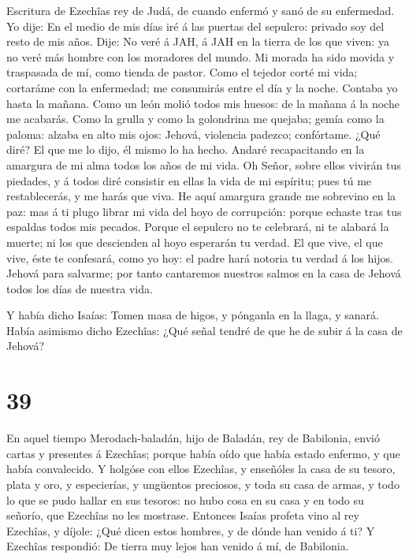  Escritura de Ezechîas rey de Judá, de cuando enfermó y sanó
de su enfermedad.  Yo dije: En el medio de mis días iré á
las puertas del sepulcro: privado soy del resto de mis años.
 Dije: No veré á JAH, á JAH en la tierra de los que viven:
ya no veré más hombre con los moradores del mundo.  Mi
morada ha sido movida y traspasada de mí, como tienda de pastor. Como el
tejedor corté mi vida; cortaráme con la enfermedad; me consumirás entre
el día y la noche.  Contaba yo hasta la mañana. Como un
león molió todos mis huesos: de la mañana á la noche me acabarás.
 Como la grulla y como la golondrina me quejaba; gemía como
la paloma: alzaba en alto mis ojos: Jehová, violencia padezco;
confórtame.  ¿Qué diré? El que me lo dijo, él mismo lo ha
hecho. Andaré recapacitando en la amargura de mi alma todos los años de
mi vida.  Oh Señor, sobre ellos vivirán tus piedades, y á
todos diré consistir en ellas la vida de mi espíritu; pues tú me
restablecerás, y me harás que viva.  He aquí amargura
grande me sobrevino en la paz: mas á ti plugo librar mi vida del hoyo de
corrupción: porque echaste tras tus espaldas todos mis pecados.
 Porque el sepulcro no te celebrará, ni te alabará la
muerte; ni los que descienden al hoyo esperarán tu verdad. 
El que vive, el que vive, éste te confesará, como yo hoy: el padre hará
notoria tu verdad á los hijos.  Jehová para salvarme; por
tanto cantaremos nuestros salmos en la casa de Jehová todos los días de
nuestra vida.

 Y había dicho Isaías: Tomen masa de higos, y pónganla en
la llaga, y sanará.  Había asimismo dicho Ezechîas: ¿Qué
señal tendré de que he de subir á la casa de Jehová?

\hypertarget{section-38}{%
\section{39}\label{section-38}}

 En aquel tiempo Merodach-baladán, hijo de Baladán, rey de
Babilonia, envió cartas y presentes á Ezechîas; porque había oído que
había estado enfermo, y que había convalecido.  Y holgóse
con ellos Ezechîas, y enseñóles la casa de su tesoro, plata y oro, y
especierías, y ungüentos preciosos, y toda su casa de armas, y todo lo
que se pudo hallar en sus tesoros: no hubo cosa en su casa y en todo su
señorío, que Ezechîas no les mostrase.  Entonces Isaías
profeta vino al rey Ezechîas, y díjole: ¿Qué dicen estos hombres, y de
dónde han venido á ti? Y Ezechîas respondió: De tierra muy lejos han
venido á mí, de Babilonia.

